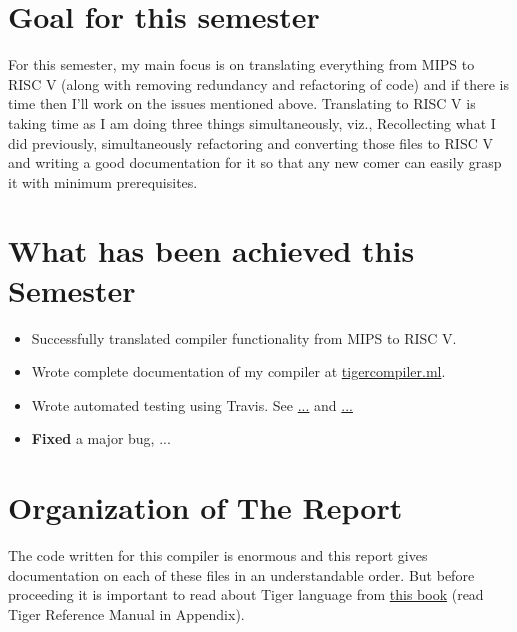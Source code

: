 \section{Goal for this semester}

For this semester, my main focus is on translating everything from MIPS to RISC V (along with removing redundancy and refactoring of code) and if there is time then I'll work on the issues mentioned above. Translating to RISC V is taking time as I am doing three things simultaneously, viz., Recollecting what I did previously, simultaneously refactoring and converting those files to RISC V and writing a good documentation for it so that any new comer can easily grasp it with minimum prerequisites. 

\section{What has been achieved this Semester}

\begin{itemize}
  \item Successfully translated compiler functionality from MIPS to RISC V. 

  \item Wrote complete documentation of my compiler at \href{tigercompiler.ml}{tigercompiler.ml}.

  \item Wrote automated testing using Travis. See \href{this}{...} and \href{this}{...}

  \item \textbf{Fixed} a major bug, ...
  
\end{itemize}

\section{Organization of The Report}

The code written for this compiler is enormous and this report gives documentation on each of these files in an understandable order. But before proceeding it is important to read about Tiger language from \href{https://www.cs.princeton.edu/~appel/modern/ml/}{this book} (read Tiger Reference Manual in Appendix). 


